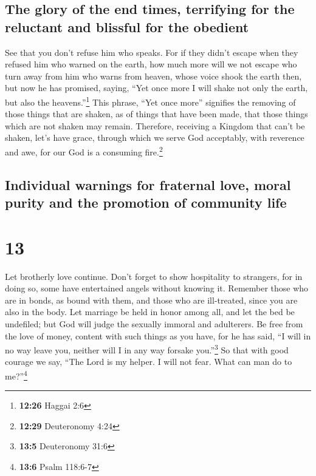 \hypertarget{the-glory-of-the-end-times-terrifying-for-the-reluctant-and-blissful-for-the-obedient}{%
\subsection{The glory of the end times, terrifying for the reluctant and
blissful for the
obedient}\label{the-glory-of-the-end-times-terrifying-for-the-reluctant-and-blissful-for-the-obedient}}

 See that you don't refuse him who speaks. For if they
didn't escape when they refused him who warned on the earth, how much
more will we not escape who turn away from him who warns from heaven,
 whose voice shook the earth then, but now he has
promised, saying, ``Yet once more I will shake not only the earth, but
also the heavens.''\footnote{\textbf{12:26} Haggai 2:6} 
This phrase, ``Yet once more'' signifies the removing of those things
that are shaken, as of things that have been made, that those things
which are not shaken may remain.  Therefore, receiving a
Kingdom that can't be shaken, let's have grace, through which we serve
God acceptably, with reverence and awe,  for our God is a
consuming fire.\footnote{\textbf{12:29} Deuteronomy 4:24}

\hypertarget{individual-warnings-for-fraternal-love-moral-purity-and-the-promotion-of-community-life}{%
\subsection{Individual warnings for fraternal love, moral purity and the
promotion of community
life}\label{individual-warnings-for-fraternal-love-moral-purity-and-the-promotion-of-community-life}}

\hypertarget{section-12}{%
\section{13}\label{section-12}}

 Let brotherly love continue.  Don't forget
to show hospitality to strangers, for in doing so, some have entertained
angels without knowing it.  Remember those who are in
bonds, as bound with them, and those who are ill-treated, since you are
also in the body.  Let marriage be held in honor among
all, and let the bed be undefiled; but God will judge the sexually
immoral and adulterers.  Be free from the love of money,
content with such things as you have, for he has said, ``I will in no
way leave you, neither will I in any way forsake you.''\footnote{\textbf{13:5}
  Deuteronomy 31:6}  So that with good courage we say,
``The Lord is my helper. I will not fear. What can man do to
me?''\footnote{\textbf{13:6} Psalm 118:6-7}

